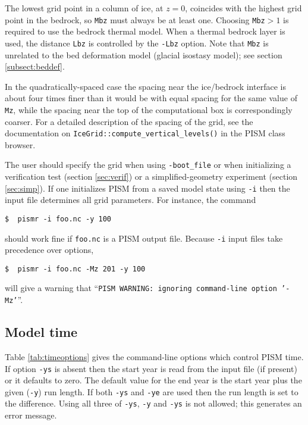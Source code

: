 The lowest grid point in a column of ice, at $z=0$, coincides with the highest grid point in the bedrock, so \texttt{Mbz} must always be at least one.  Choosing \texttt{Mbz}$>1$ is required to use the bedrock thermal model.  When a thermal bedrock layer is used, the distance \texttt{Lbz} is controlled by the \texttt{-Lbz} option.  Note that \texttt{Mbz} is unrelated to the bed deformation model (glacial isostasy model); see section \ref{subsect:beddef}.

In the quadratically-spaced case the spacing near the ice/bedrock interface is about four times finer than it would be with equal spacing for the same value of \texttt{Mz}, while the spacing near the top of the computational box is correspondingly coarser.  For a detailed description of the spacing of the grid, see the documentation on \texttt{IceGrid::compute_vertical_levels()} in the PISM class browser.

The user should specify the grid when using \texttt{-boot_file} or when initializing a verification test (section \ref{sec:verif}) or a simplified-geometry experiment (section \ref{sec:simp}).  If one initializes PISM from a saved model state using \texttt{-i} then the input file determines all grid parameters.  For instance, the command

\begin{verbatim}
$  pismr -i foo.nc -y 100
\end{verbatim}

\noindent should work fine if \texttt{foo.nc} is a PISM output file.  Because \texttt{-i} input files take precedence over options,

\begin{verbatim}
$  pismr -i foo.nc -Mz 201 -y 100
\end{verbatim}

\noindent will give a warning that ``\texttt{PISM WARNING: ignoring command-line option '-Mz'}''.


\subsection{Model time}
\label{sec:time}

Table \ref{tab:timeoptions} gives the command-line options which control PISM time.  If option \texttt{-ys} is absent then the start year is read from the input file (if present) or it defaults to zero.  The default value for the end year is the start year plus the given (\texttt{-y}) run length.  If both \texttt{-ys} and \texttt{-ye} are used then the run length is set to the difference.  Using all three of \texttt{-ys}, \texttt{-y} and \texttt{-ys} is not allowed; this generates an error message.

